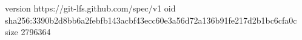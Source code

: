 version https://git-lfs.github.com/spec/v1
oid sha256:3390b2d8bb6a2febfb143acbf43ecc60e3a56d72a136b91fe217d2b1bc6cfa0c
size 2796364
